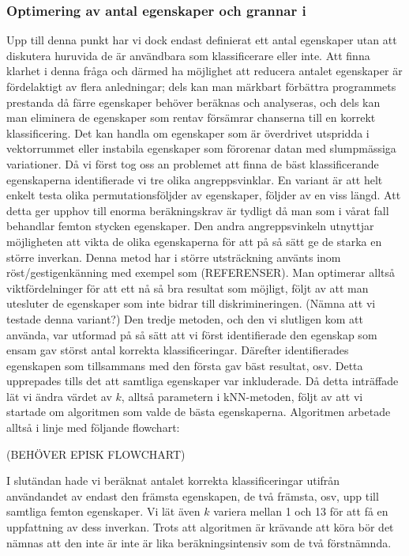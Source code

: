 \documentclass[../rapport_MVEX01-11-05]{subfiles}
\begin{document}
\subsubsection{Optimering av antal egenskaper och grannar i \knn}
Upp till denna punkt har vi dock endast definierat ett antal egenskaper utan att
diskutera huruvida de är användbara som klassificerare eller inte. Att finna
klarhet i denna fråga och därmed ha möjlighet att reducera antalet egenskaper är
fördelaktigt av flera anledningar; dels kan man märkbart förbättra programmets
prestanda då färre egenskaper behöver beräknas och analyseras, och dels kan man
eliminera de egenskaper som rentav försämrar chanserna till en korrekt
klassificering. Det kan handla om egenskaper som är överdrivet utspridda i
vektorrummet eller instabila egenskaper som förorenar datan med slumpmässiga
variationer. Då vi först tog oss an problemet att finna de bäst klassificerande
egenskaperna identifierade vi tre olika angreppsvinklar. En variant är att helt
enkelt testa olika permutationsföljder av egenskaper, följder av en viss längd.
Att detta ger upphov till enorma beräkningskrav är tydligt då man som i vårat
fall behandlar femton stycken egenskaper. Den andra angreppsvinkeln utnyttjar
möjligheten att vikta de olika egenskaperna för att på så sätt ge de starka en
större inverkan. Denna metod har i större utsträckning använts inom
röst/gestigenkänning med exempel som (REFERENSER). Man optimerar alltså
viktfördelninger för att ett nå så bra resultat som möjligt, följt av att man
utesluter de egenskaper som inte bidrar till diskrimineringen. (Nämna att vi
testade denna variant?) Den tredje metoden, och den vi slutligen kom att
använda, var utformad på så sätt att vi först identifierade den egenskap som
ensam gav störst antal korrekta klassificeringar. Därefter identifierades
egenskapen som tillsammans med den första gav bäst resultat, osv. Detta
upprepades tills det att samtliga egenskaper var inkluderade. Då detta
inträffade lät vi ändra värdet av $k$, alltså parametern i kNN-metoden, följt av
att vi startade om algoritmen som valde de bästa egenskaperna. Algoritmen
arbetade alltså i linje med följande flowchart:  

(BEHÖVER EPISK FLOWCHART)

I slutändan hade vi beräknat antalet korrekta klassificeringar utifrån
användandet av endast den främsta egenskapen, de två främsta, osv, upp till
samtliga femton egenskaper. Vi lät även $k$ variera mellan 1 och 13 för att få
en uppfattning av dess inverkan. Trots att algoritmen är krävande att köra bör
det nämnas att den inte är inte är lika beräkningsintensiv som de två
förstnämnda. 
\end{document}
